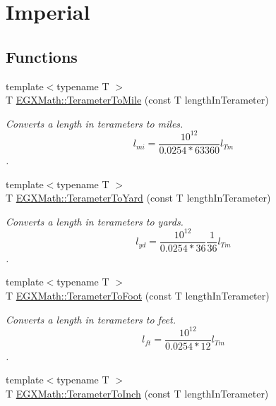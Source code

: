 \hypertarget{group___e_g_x_math-_conversions-_length_conversions-_s_i-_terameter-_imperial}{}\section{Imperial}
\label{group___e_g_x_math-_conversions-_length_conversions-_s_i-_terameter-_imperial}
\subsection*{Functions}
\begin{DoxyCompactItemize}
\item 
{\footnotesize template$<$typename T $>$ }\\T \mbox{\hyperlink{group___e_g_x_math-_conversions-_length_conversions-_s_i-_terameter-_imperial_ga51468f3ffd5925fb2cbb188d49b6aa60}{E\+G\+X\+Math\+::\+Terameter\+To\+Mile}} (const T length\+In\+Terameter)
\begin{DoxyCompactList}\small\item\em Converts a length in terameters to miles. \[ l_{mi}=\frac{10^{12}}{0.0254 * 63360} l_{Tm} \]. \end{DoxyCompactList}\item 
{\footnotesize template$<$typename T $>$ }\\T \mbox{\hyperlink{group___e_g_x_math-_conversions-_length_conversions-_s_i-_terameter-_imperial_ga4f3bcac82e02fddb21fedf80ec01275b}{E\+G\+X\+Math\+::\+Terameter\+To\+Yard}} (const T length\+In\+Terameter)
\begin{DoxyCompactList}\small\item\em Converts a length in terameters to yards. \[ l_{yd}= \frac{10^{12}}{0.0254 * 36} \frac{1}{36} l_{Tm} \]. \end{DoxyCompactList}\item 
{\footnotesize template$<$typename T $>$ }\\T \mbox{\hyperlink{group___e_g_x_math-_conversions-_length_conversions-_s_i-_terameter-_imperial_gaf903b744223a3acb964367da6f14b96f}{E\+G\+X\+Math\+::\+Terameter\+To\+Foot}} (const T length\+In\+Terameter)
\begin{DoxyCompactList}\small\item\em Converts a length in terameters to feet. \[ l_{ft}= \frac{10^{12}}{0.0254 * 12} l_{Tm} \]. \end{DoxyCompactList}\item 
{\footnotesize template$<$typename T $>$ }\\T \mbox{\hyperlink{group___e_g_x_math-_conversions-_length_conversions-_s_i-_terameter-_imperial_ga85c9ddc82ba02c1fea0b22b896fed936}{E\+G\+X\+Math\+::\+Terameter\+To\+Inch}} (const T length\+In\+Terameter)

\end{DoxyCompactItemize}
